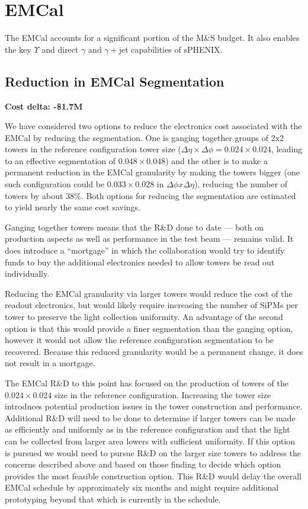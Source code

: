 \section{EMCal}

The EMCal accounts for a significant portion of the M\&S budget.  It
also enables the key $\Upsilon$ and direct $\gamma$ and $\gamma+$jet
capabilities of sPHENIX.

\subsection{Reduction in EMCal Segmentation}
\label{emcal_ganging}
\label{emcal_segmentation}

\textbf{Cost delta: -\$1.7M}

We have considered two options to reduce the electronics cost
associated with the EMCal by reducing the segmentation.  One is
ganging together groups of 2x2 towers in the reference configuration
tower size ($\Delta\eta\times\Delta\phi = 0.024\times0.024$, leading
to an effective segmentation of $0.048 \times 0.048$) and the other is
to make a permanent reduction in the EMCal granularity by making the
towers bigger (one such configuration could be $0.033 \times 0.028$ in
$\Delta \phi x \Delta \eta$), reducing the number of towers by about
38\%. Both options for reducing the segmentation are estimated to
yield nearly the same cost savings.

Ganging together towers means that the R\&D done to date --- both on
production aspects as well as performance in the test beam --- remains
valid.  It does introduce a ``mortgage'' in which the collaboration
would try to identify funds to buy the additional electronics needed
to allow towers be read out individually.

Reducing the EMCal granularity via larger towers would reduce the cost
of the readout electronics, but would likely require increasing the
number of SiPMs per tower to preserve the light collection
uniformity. An advantage of the second option is that this would
provide a finer segmentation than the ganging option, however it would
not allow the reference configuration segmentation to be recovered.
Because this reduced granularity would be a permanent change, it does
not result in a mortgage.

The EMCal R\&D to this point has focused on the production of towers
of the $0.024\times 0.024$ size in the reference configuration.
Increasing the tower size introduces potential production issues in
the tower construction and performance. Additional R\&D will need to
be done to determine if larger towers can be made as efficiently and
uniformly as in the reference configuration and that the light can be
collected from larger area lowers with sufficient uniformity.  If this
option is pursued we would need to pursue R\&D on the larger size
towers to address the concerns described above and based on those
finding to decide which option provides the most feasible construction
option.  This R\&D would delay the overall EMCal schedule by
approximately six months and might require additional prototyping
beyond that which is currently in the schedule.
